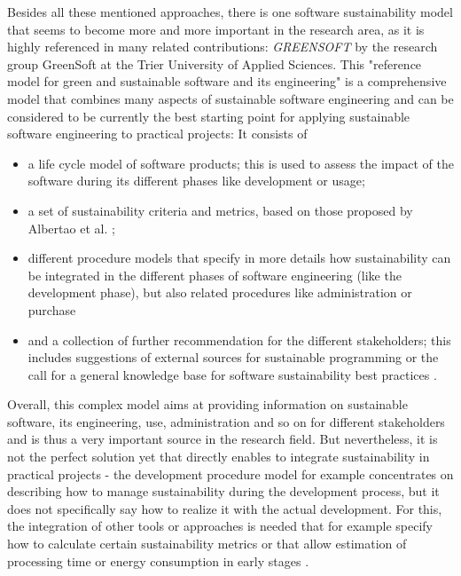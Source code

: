 \documentclass[oribibl]{llncs}
\begin{document}
Besides all these mentioned approaches, there is one software sustainability model that seems to become more and more important in the research area, as it is highly referenced in many related contributions: \textit{GREENSOFT}\cite{naumann_greensoft_2011} by the research group GreenSoft at the Trier University of Applied Sciences. This "reference model for green and sustainable software and its engineering" \cite{naumann_greensoft_2011} is a comprehensive model that combines many aspects of sustainable software engineering %
and can be considered to be currently the best starting point for applying sustainable software engineering to practical projects: It consists of
\begin{itemize}
	\item a life cycle model of software products; this is used to assess the impact of the software during its different phases like development or usage; \cite{naumann_greensoft_2011}
	\item a set of sustainability criteria and metrics, based on those proposed by Albertao et al. \cite{albertao_measuring_2010}; \cite{naumann_greensoft_2011}
	\item different procedure models that specify in more details how sustainability can be integrated in the different phases of software engineering (like the development phase), but also related procedures like administration or purchase \cite{naumann_greensoft_2011}
	\item and a collection of further recommendation for the different stakeholders; this includes suggestions of external sources for sustainable programming or the call for a general knowledge base for software sustainability best practices \cite{naumann_greensoft_2011}.
\end{itemize} 
Overall, this complex model aims at providing information on sustainable software, its engineering, use, administration and so on for different stakeholders and is thus a very important source in the research field. But nevertheless, it is not the perfect solution yet that directly enables to integrate sustainability in practical projects - the development procedure model for example concentrates on describing how to manage sustainability %
during the development process, %
but it does not specifically say how to realize it with the actual development. For this, the integration of other tools or approaches is needed that for example specify how to calculate certain sustainability metrics or that allow estimation of processing time or energy consumption in early stages \cite{naumann_greensoft_2011} %
.
\end{document}
